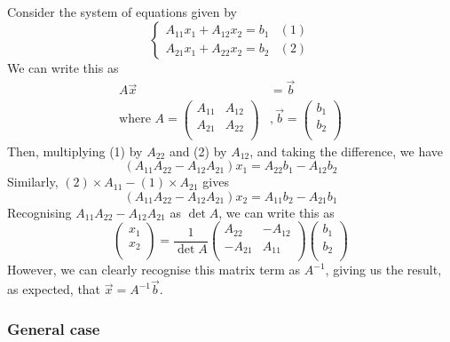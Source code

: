 \documentclass{../template/note}
\begin{document}
    Consider the system of equations given by
    \[
        \begin{cases}
            A_{11}x_1 + A_{12}x_2 = b_1 & (1) \\
            A_{21}x_1 + A_{22}x_2 = b_2 & (2)
        \end{cases}
    \]
    We can write this as
    \begin{align*}
        A \vec x &= \vec b \\
        \text{where } A = \begin{pmatrix}
         A_{11} & A_{12} \\
         A_{21} & A_{22} \\
        \end{pmatrix}&, \vec b = \begin{pmatrix}
         b_1 \\
         b_2 \\
        \end{pmatrix}
    \end{align*}
    Then, multiplying (1) by \(A_{22}\) and (2) by \(A_{12}\), and taking the difference, we have
    \[
        (A_{11}A_{22} - A_{12}A_{21})x_1 = A_{22}b_1 - A_{12}b_2
    \]
    Similarly, \((2) \times A_{11} - (1) \times A_{21}\) gives
    \[
        (A_{11}A_{22} - A_{12}A_{21})x_2 = A_{11}b_2 - A_{21}b_1
    \]
    Recognising \(A_{11}A_{22} - A_{12}A_{21}\) as \(\det A\), we can write this as
    \[
        \begin{pmatrix}
         x_1 \\
         x_2 \\
        \end{pmatrix} = \frac{1}{\det A} \begin{pmatrix}
         A_{22} & -A_{12} \\
         -A_{21} & A_{11} \\
        \end{pmatrix} \begin{pmatrix}
         b_1 \\
         b_2 \\
        \end{pmatrix}
    \]
    However, we can clearly recognise this matrix term as \(A^{-1}\), giving us the result, as expected, that \(\vec x = A^{-1} \vec b\).

    \subsubsection{General case}
\end{document}
